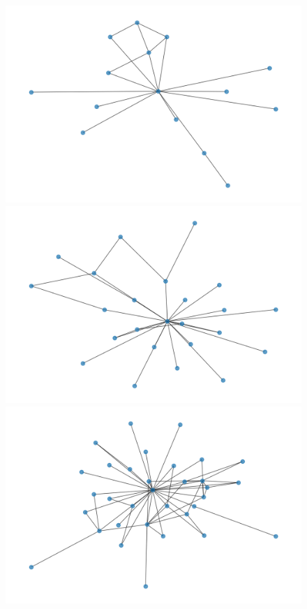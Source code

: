 \begin{figure}[htbp]
	\centering
	\begin{minipage}{.24\textwidth}
		\centering
		\includegraphics[width=1\linewidth]{problem_02/network_phase1}
	\end{minipage}
	\begin{minipage}{.24\textwidth}
		\centering
		\includegraphics[width=1\linewidth]{problem_02/network_phase2}
	\end{minipage}
	\begin{minipage}{.24\textwidth}
		\centering
		\includegraphics[width=1\linewidth]{problem_02/network_phase3}

\end{minipage}
\end{figure}
